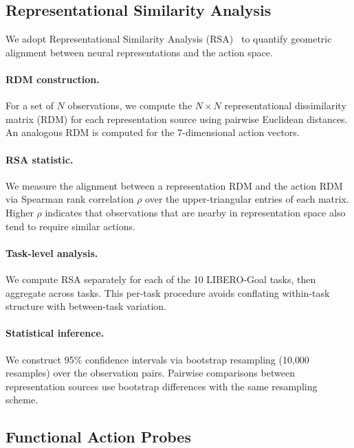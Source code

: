 \subsection{Representational Similarity Analysis}
\label{sec:rsa}

We adopt Representational Similarity Analysis (RSA)~\cite{kriegeskorte2008} to quantify geometric alignment between neural representations and the action space.

\paragraph{RDM construction.}
For a set of $N$ observations, we compute the $N \times N$ representational dissimilarity matrix (RDM) for each representation source using pairwise Euclidean distances.
An analogous RDM is computed for the 7-dimensional action vectors.

\paragraph{RSA statistic.}
We measure the alignment between a representation RDM and the action RDM via Spearman rank correlation $\rho$ over the upper-triangular entries of each matrix.
Higher $\rho$ indicates that observations that are nearby in representation space also tend to require similar actions.

\paragraph{Task-level analysis.}
We compute RSA separately for each of the 10 LIBERO-Goal tasks, then aggregate across tasks.
This per-task procedure avoids conflating within-task structure with between-task variation.

\paragraph{Statistical inference.}
We construct 95\% confidence intervals via bootstrap resampling (10{,}000 resamples) over the observation pairs.
Pairwise comparisons between representation sources use bootstrap differences with the same resampling scheme.

\subsection{Functional Action Probes}
\label{sec:probes}

